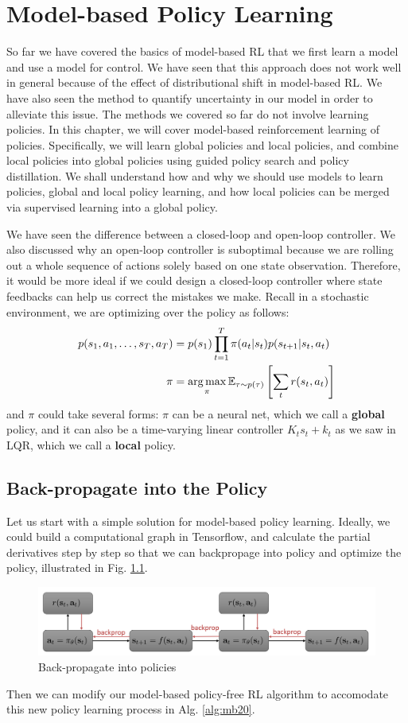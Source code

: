 \chapter{Model-based Policy Learning}
So far we have covered the basics of model-based RL that we first learn a model and use a model for control. We have seen that this approach does not work well in general because of the effect of distributional shift in model-based RL. We have also seen the method to quantify uncertainty in our model in order to alleviate this issue. The methods we covered so far do not involve learning policies. In this chapter, we will cover model-based reinforcement learning of policies. Specifically, we will learn global policies and local policies, and combine local policies into global policies using guided policy search and policy distillation. We shall understand how and why we should use models to learn policies, global and local policy learning, and how local policies can be merged via supervised learning into a global policy.

We have seen the difference between a closed-loop and open-loop controller. We also discussed why an open-loop controller is suboptimal because we are rolling out a whole sequence of actions solely based on one state observation. Therefore, it would be more ideal if we could design a closed-loop controller where state feedbacks can help us correct the mistakes we make. Recall in a stochastic environment, we are optimizing over the policy as follows:
\begin{align*}
    p(s_1,a_1,\dots,s_T,a_T)&=p(s_1)\prod_{t=1}^T\pi(a_t|s_t)p(s_{t+1}|s_t,a_t)\\
    \pi&=\operatorname*{arg\,max}_\pi \mathbb{E}_{\tau\sim p(\tau)}\left[\sum_t r(s_t,a_t)\right]
\end{align*}
and $\pi$ could take several forms: $\pi$ can be a neural net, which we call a \textbf{global} policy, and it can also be a time-varying linear controller $K_t s_t + k_t$ as we saw in LQR, which we call a \textbf{local} policy.

\section{Back-propagate into the Policy}
Let us start with a simple solution for model-based policy learning. Ideally, we could build a computational graph in Tensorflow, and calculate the partial derivatives step by step so that we can backpropage into policy and optimize the policy, illustrated in Fig. \ref{fig:poliback}.
\begin{figure}
    \centering
    \includegraphics[scale=0.4]{figures/poliback.png}
    \caption{Back-propagate into policies}
    \label{fig:poliback}
\end{figure}
Then we can modify our model-based policy-free RL algorithm to accomodate this new policy learning process in Alg. \ref{alg:mb20}.


